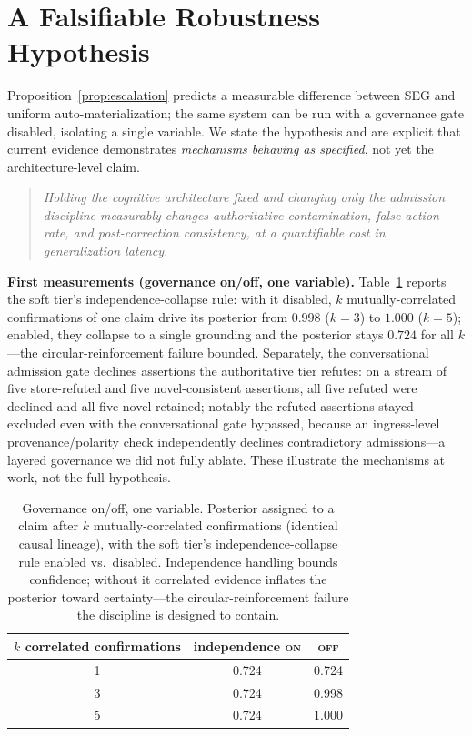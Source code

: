 \documentclass[11pt]{article}
\theoremstyle{plain}
\theoremstyle{definition}
\begin{document}
\section{A Falsifiable Robustness Hypothesis}
\label{sec:empirical}

Proposition~\ref{prop:escalation} predicts a measurable difference between SEG and
uniform auto-materialization; the same system can be run with a governance gate
disabled, isolating a single variable. We state the hypothesis and are explicit
that current evidence demonstrates \emph{mechanisms behaving as specified}, not
yet the architecture-level claim.

\begin{quote}\itshape
Holding the cognitive architecture fixed and changing only the admission
discipline measurably changes authoritative contamination, false-action rate, and
post-correction consistency, at a quantifiable cost in generalization latency.
\end{quote}

\noindent\textbf{First measurements (governance on/off, one variable).}
Table~\ref{tab:ablation} reports the soft tier's independence-collapse rule: with
it disabled, $k$ mutually-correlated confirmations of one claim drive its posterior
from $0.998$ ($k{=}3$) to $1.000$ ($k{=}5$); enabled, they collapse to a single
grounding and the posterior stays $0.724$ for all $k$---the circular-reinforcement
failure bounded. Separately, the conversational admission gate declines assertions
the authoritative tier refutes: on a stream of five store-refuted and five
novel-consistent assertions, all five refuted were declined and all five novel
retained; notably the refuted assertions stayed excluded even with the
conversational gate bypassed, because an ingress-level provenance/polarity check
independently declines contradictory admissions---a layered governance we did not
fully ablate. These illustrate the mechanisms at work, not the full hypothesis.

\begin{table}[t]
\centering
\small
\begin{tabular}{c c c}
\hline
$k$ correlated confirmations & independence \textsc{on} & \textsc{off}\\
\hline
1 & 0.724 & 0.724\\
3 & 0.724 & 0.998\\
5 & 0.724 & 1.000\\
\hline
\end{tabular}
\caption{Governance on/off, one variable. Posterior assigned to a claim after $k$
mutually-correlated confirmations (identical causal lineage), with the soft
tier's independence-collapse rule enabled vs.\ disabled. Independence handling
bounds confidence; without it correlated evidence inflates the posterior toward
certainty---the circular-reinforcement failure the discipline is designed to
contain.}
\label{tab:ablation}
\end{table}
\end{document}
